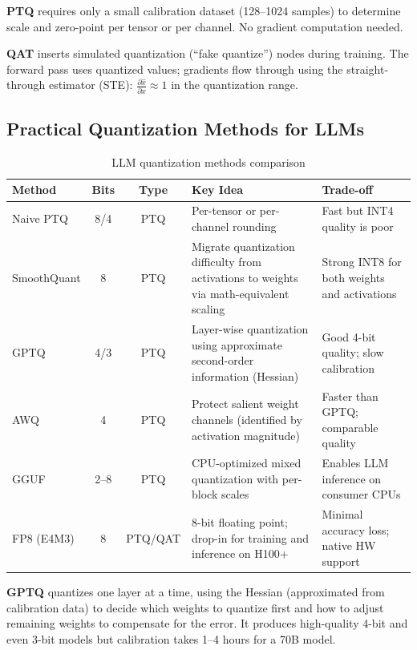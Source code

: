\textbf{PTQ} requires only a small calibration dataset (128--1024 samples) to determine scale and zero-point per tensor or per channel. No gradient computation needed.

\textbf{QAT} inserts simulated quantization (``fake quantize'') nodes during training. The forward pass uses quantized values; gradients flow through using the straight-through estimator (STE): $\frac{\partial \hat{x}}{\partial x} \approx 1$ in the quantization range.

\subsection{Practical Quantization Methods for LLMs}

\begin{table}[H]
\centering
\caption{LLM quantization methods comparison}
\begin{tabularx}{\textwidth}{lccXX}
\toprule
\textbf{Method} & \textbf{Bits} & \textbf{Type} & \textbf{Key Idea} & \textbf{Trade-off} \\
\midrule
Naive PTQ & 8/4 & PTQ & Per-tensor or per-channel rounding & Fast but INT4 quality is poor \\
SmoothQuant & 8 & PTQ & Migrate quantization difficulty from activations to weights via math-equivalent scaling & Strong INT8 for both weights and activations \\
GPTQ & 4/3 & PTQ & Layer-wise quantization using approximate second-order information (Hessian) & Good 4-bit quality; slow calibration \\
AWQ & 4 & PTQ & Protect salient weight channels (identified by activation magnitude) & Faster than GPTQ; comparable quality \\
GGUF & 2--8 & PTQ & CPU-optimized mixed quantization with per-block scales & Enables LLM inference on consumer CPUs \\
FP8 (E4M3) & 8 & PTQ/QAT & 8-bit floating point; drop-in for training and inference on H100+ & Minimal accuracy loss; native HW support \\
\bottomrule
\end{tabularx}
\end{table}

\textbf{GPTQ} quantizes one layer at a time, using the Hessian (approximated from calibration data) to decide which weights to quantize first and how to adjust remaining weights to compensate for the error. It produces high-quality 4-bit and even 3-bit models but calibration takes 1--4 hours for a 70B model.

